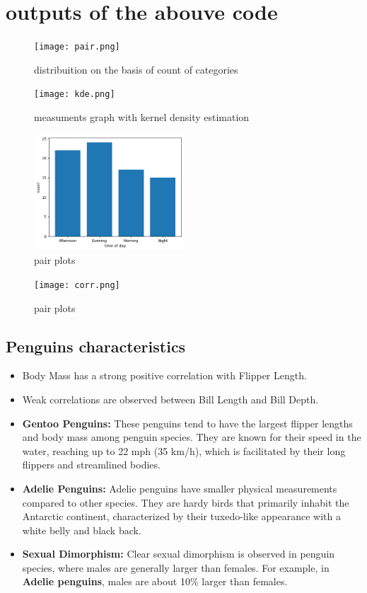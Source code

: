 \documentclass[12pt]{article}
\begin{document}
\section*{outputs of the abouve code}
\begin{figure}[h]
    \centering
    \texttt{[image: pair.png]}
    \caption{distribuition on the basis of count of categories}
    \label{fig:label}
\end{figure}
\begin{figure}[h]
    \centering
    \texttt{[image: kde.png]}
    \caption{measuments graph with kernel density estimation}
    \label{fig:label}
\end{figure}

\begin{figure}[h]
    \centering
    \includegraphics[width=0.5\textwidth]{download.png}
    \caption{pair plots}
    \label{fig:label}
\end{figure}
\begin{figure}[h]
    \centering
    \texttt{[image: corr.png]}
    \caption{pair plots}
    \label{fig:label}
\end{figure}
\subsection*{Penguins characteristics }
\begin{itemize}
    \item Body Mass has a strong positive correlation with Flipper Length.
    \item Weak correlations are observed between Bill Length and Bill Depth.
\end{itemize}


\begin{itemize}
    \item \textbf{Gentoo Penguins:} These penguins tend to have the largest flipper lengths and body mass among penguin species. They are known for their speed in the water, reaching up to 22 mph (35 km/h), which is facilitated by their long flippers and streamlined bodies.
    
    \item \textbf{Adelie Penguins:} Adelie penguins have smaller physical measurements compared to other species. They are hardy birds that primarily inhabit the Antarctic continent, characterized by their tuxedo-like appearance with a white belly and black back.
    
    \item \textbf{Sexual Dimorphism:} Clear sexual dimorphism is observed in penguin species, where males are generally larger than females. For example, in \textbf{Adelie penguins}, males are about 10\% larger than females.
\end{itemize}
\end{document}
